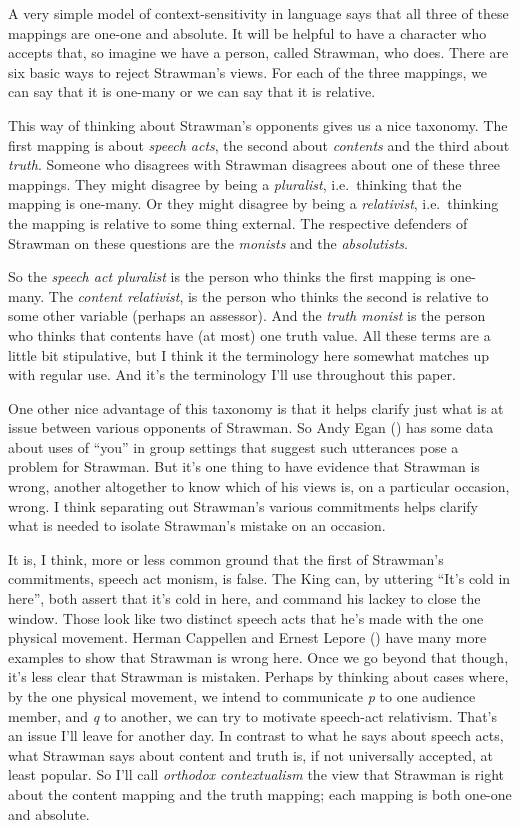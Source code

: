 \documentclass[
  10pt,
  letterpaper,
  DIV=11,
  numbers=noendperiod,
  twoside]{scrartcl}
\begin{document}
A very simple model of context-sensitivity in language says that all
three of these mappings are one-one and absolute. It will be helpful to
have a character who accepts that, so imagine we have a person, called
Strawman, who does. There are six basic ways to reject Strawman's views.
For each of the three mappings, we can say that it is one-many or we can
say that it is relative.

This way of thinking about Strawman's opponents gives us a nice
taxonomy. The first mapping is about \emph{speech acts}, the second
about \emph{contents} and the third about \emph{truth}. Someone who
disagrees with Strawman disagrees about one of these three mappings.
They might disagree by being a \emph{pluralist}, i.e.~thinking that the
mapping is one-many. Or they might disagree by being a
\emph{relativist}, i.e.~thinking the mapping is relative to some thing
external. The respective defenders of Strawman on these questions are
the \emph{monists} and the \emph{absolutists}.

So the \emph{speech act pluralist} is the person who thinks the first
mapping is one-many. The \emph{content relativist}, is the person who
thinks the second is relative to some other variable (perhaps an
assessor). And the \emph{truth monist} is the person who thinks that
contents have (at most) one truth value. All these terms are a little
bit stipulative, but I think it the terminology here somewhat matches up
with regular use. And it's the terminology I'll use throughout this
paper.

One other nice advantage of this taxonomy is that it helps clarify just
what is at issue between various opponents of Strawman. So Andy Egan
() has some data about uses of
``you'' in group settings that suggest such utterances pose a problem
for Strawman. But it's one thing to have evidence that Strawman is
wrong, another altogether to know which of his views is, on a particular
occasion, wrong. I think separating out Strawman's various commitments
helps clarify what is needed to isolate Strawman's mistake on an
occasion.

It is, I think, more or less common ground that the first of Strawman's
commitments, speech act monism, is false. The King can, by uttering
``It's cold in here'', both assert that it's cold in here, and command
his lackey to close the window. Those look like two distinct speech acts
that he's made with the one physical movement. Herman Cappellen and
Ernest Lepore ()
have many more examples to show that Strawman is wrong here. Once we go
beyond that though, it's less clear that Strawman is mistaken. Perhaps
by thinking about cases where, by the one physical movement, we intend
to communicate \emph{p} to one audience member, and \emph{q} to another,
we can try to motivate speech-act relativism. That's an issue I'll leave
for another day. In contrast to what he says about speech acts, what
Strawman says about content and truth is, if not universally accepted,
at least popular. So I'll call \emph{orthodox contextualism} the view
that Strawman is right about the content mapping and the truth mapping;
each mapping is both one-one and absolute.
\end{document}

